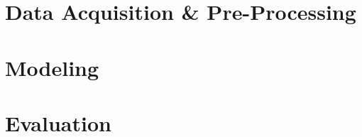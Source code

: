 \documentclass[sigconf]{acmart}
\begin{document}
\section{Data Acquisition \& Pre-Processing}



\section{Modeling}


\section{Evaluation}





\appendix
\end{document}
